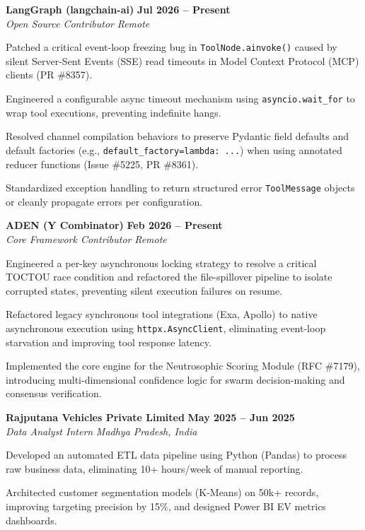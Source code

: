\documentclass[a4paper,10pt]{article}
\newcommand{\resumeSubheading}[4]{
  \item
    \textbf{#1} \hfill \textbf{\small #4} \\
    \textit{\small#3} \hfill \textit{\small #2}\par\vspace{1pt}
}
\newcommand{\resumeItemListStart}{\begin{resumeItemList}}
\newcommand{\resumeItemListEnd}{\end{resumeItemList}}
\begin{document}
  \resumeSubheading
    {LangGraph (langchain-ai)}{Remote}
    {Open Source Contributor}{Jul 2026 -- Present}
    \resumeItemListStart
      \item {Patched a critical event-loop freezing bug in \texttt{ToolNode.ainvoke()} caused by silent Server-Sent Events (SSE) read timeouts in Model Context Protocol (MCP) clients (PR \#8357).}
      \item {Engineered a configurable async timeout mechanism using \texttt{asyncio.wait\_for} to wrap tool executions, preventing indefinite hangs.}
      \item {Resolved channel compilation behaviors to preserve Pydantic field defaults and default factories (e.g., \texttt{default\_factory=lambda: ...}) when using annotated reducer functions (Issue \#5225, PR \#8361).}
      \item {Standardized exception handling to return structured error \texttt{ToolMessage} objects or cleanly propagate errors per configuration.}
    \resumeItemListEnd

  \resumeSubheading
    {ADEN (Y Combinator)}{Remote}
    {Core Framework Contributor}{Feb 2026 -- Present}
    \resumeItemListStart
      \item {Engineered a per-key asynchronous locking strategy to resolve a critical TOCTOU race condition and refactored the file-spillover pipeline to isolate corrupted states, preventing silent execution failures on resume.}
      \item {Refactored legacy synchronous tool integrations (Exa, Apollo) to native asynchronous execution using \texttt{httpx.AsyncClient}, eliminating event-loop starvation and improving tool response latency.}
      \item {Implemented the core engine for the Neutrosophic Scoring Module (RFC \#7179), introducing multi-dimensional confidence logic for swarm decision-making and consensus verification.}
    \resumeItemListEnd

  \resumeSubheading
    {Rajputana Vehicles Private Limited}{Madhya Pradesh, India}
    {Data Analyst Intern}{May 2025 -- Jun 2025}
    \resumeItemListStart
      \item {Developed an automated ETL data pipeline using Python (Pandas) to process raw business data, eliminating 10+ hours/week of manual reporting.}
      \item {Architected customer segmentation models (K-Means) on 50k+ records, improving targeting precision by 15\%, and designed Power BI EV metrics dashboards.}
    \resumeItemListEnd
\end{document}

